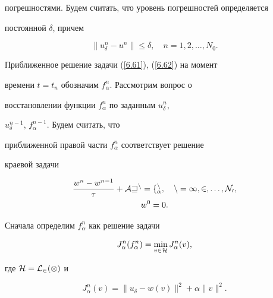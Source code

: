погрешностями. Будем считать, что уровень погрешностей определяется


постоянной $\delta$, причем


\begin{equation}\label{6.62}


\|u^n_{\delta} - u^n\| \le \delta ,


\quad n = 1,2,\dotsc, N_0.


\end{equation}





Приближенное решение задачи (\ref{6.61}), (\ref{6.62}) на момент


времени $t = t_n$ обозначим $f_{\alpha}^n$. Рассмотрим вопрос о


восстановлении функции $f_{\alpha}^n$ по заданным $u^n_{\delta}$,


$u^{n-1}_{\delta}$, $f_{\alpha}^{n-1}$. Будем считать, что


приближенной правой части  $f_{\alpha}^n$ соответствует решение


краевой задачи


\begin{gather}\label{6.63}


\frac{w^n - w^{n-1}}{\tau} + \cal{A} w^n = f_{\alpha}^n,


\quad n = 1,2,\dotsc, N_0, \\


%


\label{6.64}


w^0 = 0 .


\end{gather}





Сначала определим $f_{\alpha}^n$ как решение задачи




$$


J_{\alpha}^n (f_{\alpha}^n) = \min_{v \in \cal{H}}


J_{\alpha}^n (v),




$$


где $\cal{H} = \cal{L}_2(\Omega)$   и


\begin{equation}\label{6.66}


J_{\alpha}^n (v) =


\|u_{\delta} - w(v) \|^2 + \alpha \|v\|^2 .


\end{equation}


